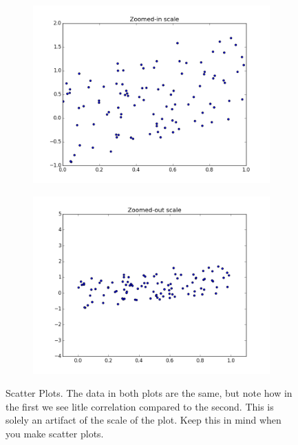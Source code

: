 \begin{figure}[h]
\centering
\begin{subfigure}{.45\textwidth}
\centering
\includegraphics[width=\textwidth]{scale_scatter_zoomed_in.png}
\end{subfigure}
\begin{subfigure}{.45\textwidth}
\centering
\includegraphics[width=\textwidth]{scale_scatter_zoomed_out.png}
\end{subfigure}
\caption{Scatter Plots.  The data in both plots are the same, but note how in the first we see litle correlation compared to the second.  This is solely an artifact of the scale of the plot.  Keep this in mind when you make scatter plots.}
\label{fig:scatter_correlation}
\end{figure}


